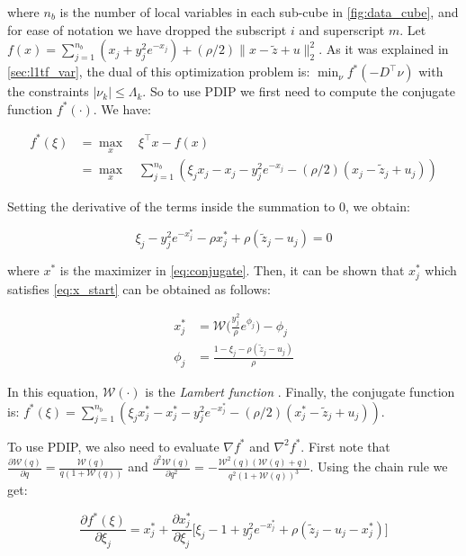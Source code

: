 \documentclass{article}
\begin{document}
\noindent where $n_b$ is the number of local variables in each sub-cube in \autoref{fig:data_cube}, and for ease of notation we have dropped the subscript $i$ and superscript $m$. Let $f(x)=\sum_{j=1}^{n_b} (x_j + y_j^2e^{-x_j}) + (\rho/2) \lVert x-\tilde{z} + u \lVert_2^2$. As it was explained in \autoref{sec:l1tf_var}, the dual of this optimization problem is: $\min_\nu f^*(-D^\top\nu)$ with the constraints $|\nu_k| \le \Lambda_k$. So to use PDIP we first need to compute the conjugate function $f^*(\cdot)$. We have:


\begin{align}
f^*(\xi) & = \max_x \quad \xi^\top x - f(x)\\
& =  \max_x \quad \sum_{j=1}^{n_b} (\xi_jx_j - x_j - y_j^2e^{-x_j} - (\rho/2)(x_j-\tilde{z}_j+u_j))
\label{eq:conjugate}
\end{align}

Setting the derivative of the terms inside the summation to 0, we obtain:

\begin{equation}
\xi_j-y_j^2e^{-x_j^*}-\rho x_j^* + \rho (\tilde{z}_j-u_j)=0
\label{eq:x_start}
\end{equation}

\noindent where $x^*$ is the maximizer in \ref{eq:conjugate}. Then, it can be shown that $x_j^*$ which satisfies \eqref{eq:x_start} can be obtained as follows:

\begin{align}
x^*_j & = \mathscr{W}\bigg(\frac{y_j^2}{\rho} e^{\phi_j} \bigg) - \phi_j \\
\phi_j & =\frac{1-\xi_j-\rho(\tilde{z}_j-u_j)}{\rho}
\end{align}

In this equation, $\mathscr{W}(\cdot)$ is the \textit{Lambert function} \cite{corless_lambertw_1996}. Finally, the conjugate function is: $f^*(\xi) = \sum_{j=1}^{n_b} (\xi_jx^*_j - x^*_j - y_j^2e^{-x^*_j} - (\rho/2)(x^*_j-\tilde{z}_j+u_j))$.

To use PDIP, we also need to evaluate $\nabla f^*$ and $\nabla^2 f^*$. First note that $\frac{\partial \mathscr{W}(q)}{\partial q} = \frac{\mathscr{W}(q)}{q(1+\mathscr{W}(q))}$ and $\frac{\partial^2 \mathscr{W}(q)}{\partial q^2} = - \frac{\mathscr{W}^2(q)(\mathscr{W}(q)+q)}{q^2(1+\mathscr{W}(q))^3}$. Using the chain rule we get:


\begin{equation}
\frac{\partial f^*(\xi)}{\partial \xi_j}  =  x^*_j  + \frac{\partial x^*_j}{\partial \xi_j} \bigg[ \xi_j -1 + y_j^2 e^{-x_j^*} + \rho (\tilde{z}_j - u_j - x_j^*) \bigg]
\label{eq:d_f*_start}
\end{equation}
\end{document}
